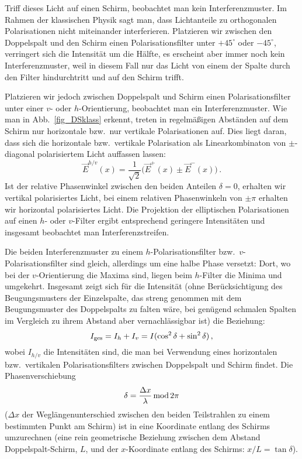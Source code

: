 Triff dieses Licht auf einen Schirm, beobachtet man kein Interferenzmuster. Im Rahmen der
klassischen Physik sagt man, dass Lichtanteile zu orthogonalen Polarisationen nicht
miteinander interferieren. Platzieren wir zwischen den Doppelspalt und den Schirm einen
Polarisationsfilter unter $+ 45^\circ$ oder $-45^\circ$, verringert sich die Intensit\"at um die
H\"alfte, es erscheint aber immer noch kein Interferenzmuster, weil in diesem Fall nur das
Licht von einem der Spalte durch den Filter hindurchtritt und auf den Schirm trifft. 

Platzieren wir jedoch zwischen Doppelspalt und Schirm einen Polarisationsfilter unter einer
$v$- oder $h$-Orientierung,
beobachtet man ein Interferenzmuster. Wie man in Abb.\ \ref{fig_DSklass} erkennt, treten in
regelm\"a\ss igen Abst\"anden auf dem Schirm nur horizontale bzw.\ nur vertikale Polarisationen
auf. Dies liegt daran, dass sich die horizontale bzw.\ vertikale Polarisation als Linearkombinaton
von $\pm$-diagonal polarisiertem Licht auffassen lassen:
\begin{equation}
             \vec{E}^{h/v}(x) = \frac{1}{\sqrt{2}} \big( \vec{E}^{+}(x) \pm \vec{E}^{-}(x) \big) \, .
\end{equation}
Ist der relative Phasenwinkel zwischen den beiden Anteilen $\delta=0$,
erhalten wir vertikal polarisiertes Licht, bei einem relativen Phasenwinkeln von $\pm \pi$ erhalten wir
horizontal polarisiertes Licht. Die Projektion der elliptischen Polarisationen auf einen $h$- oder $v$-Filter
ergibt entsprechend geringere Intensit\"aten und insgesamt beobachtet man Interferenzstreifen.

Die beiden Interferenzmuster zu einem $h$-Polarisationsfilter bzw.\ $v$-Polarisationsfilter
sind gleich, allerdings um eine halbe Phase versetzt:
Dort, wo bei der $v$-Orientierung die Maxima sind, liegen beim $h$-Filter die Minima und
umgekehrt. Insgesamt zeigt sich f\"ur die Intensit\"at (ohne Ber\"ucksichtigung des Beugungsmusters
der Einzelspalte, das streng genommen mit dem Beugungsmuster des Doppelspalts zu falten w\"are,
bei gen\"ugend schmalen Spalten im Vergleich zu ihrem Abstand aber vernachl\"assigbar ist) 
die Beziehung:
\begin{equation}
              I_{\rm ges} =   I_h + I_v = I ( \cos^2 \delta + \sin^2 \delta)   \, ,
\end{equation}
wobei $I_{h/v}$ die Intensit\"aten sind, die man bei Verwendung eines horizontalen bzw.\
vertikalen Polarisationsfilters zwischen Doppelspalt und Schirm findet. Die Phasenverschiebung
\begin{equation}
        \delta = \frac{\Delta x}{\lambda} \, {\rm mod}\, 2\pi
\end{equation}
($\Delta x$ der Wegl\"angenunterschied zwischen den beiden Teilstrahlen zu einem
bestimmten Punkt am Schirm) 
ist in eine Koordinate entlang des Schirms umzurechnen (eine rein geometrische
Beziehung zwischen dem Abstand Doppelspalt-Schirm, $L$, und der $x$-Koordinate entlang des 
Schirms: $x/L=\tan \delta$). 

